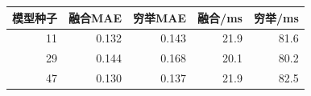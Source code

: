\begin{tabular}{rrrrr}\toprule
模型种子 & 融合MAE & 穷举MAE & 融合/ms & 穷举/ms\\\midrule
11 & 0.132 & 0.143 & 21.9 & 81.6\\
29 & 0.144 & 0.168 & 20.1 & 80.2\\
47 & 0.130 & 0.137 & 21.9 & 82.5\\
\bottomrule\end{tabular}
